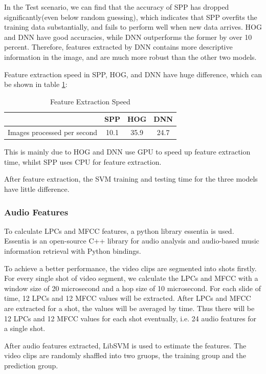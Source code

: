 \documentclass{article}
\begin{document}
  In the Test scenario, we can find that the accuracy of SPP has dropped significantly(even below random guessing), which indicates that SPP overfits the training data substantially, and fails to perform well when new data arrives. HOG and DNN have good accuracies, while DNN outperforms the former by over 10 percent. Therefore, features extracted by DNN contains more descriptive information in the image, and are much more robust than the other two models.

  Feature extraction speed in SPP, HOG, and DNN have huge difference, which can be shown in table \ref{table:frame-speed}:

  \begin{table}
      \begin{tabular}{cccc}
          \hline
          & SPP & HOG & DNN \\
          \hline
          Images processed per second & 10.1 & 35.9 & 24.7 \\
          \hline
      \end{tabular}
      \caption{Feature Extraction Speed}
      \label{table:frame-speed}
  \end{table}
  This is mainly due to HOG and DNN use GPU to speed up feature extraction time, whilst SPP uses CPU for feature extraction.\par
  After feature extraction, the SVM training and testing time for the three models have little difference.

  \subsubsection{Audio Features}

  To calculate LPCs and MFCC features, a python library essentia is used. Essentia is an open-source C++ library for audio analysis and audio-based music information retrieval with Python bindings.

  To achieve a better performance, the video clips are segmented into shots firstly. For every single shot of video segment, we calculate the LPCs and MFCC with a window size of 20 microsecond and a hop size of 10 microsecond. For each slide of time, 12 LPCs and 12 MFCC values will be extracted. After LPCs and MFCC are extracted for a shot, the values will be averaged by time. Thus there will be 12 LPCs and 12 MFCC values for each shot eventually, i.e. 24 audio features for a single shot. 

  After audio features extracted, LibSVM is used to estimate the features. The video clips are randomly shaffled into two gruops, the training group and the prediction group. 
\end{document}
